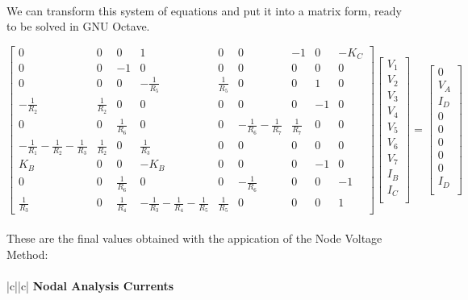 \paragraph{}
We can transform this system of equations and put it into a matrix form, ready to be solved in GNU Octave.

\[
\begin{bmatrix}
0 & 0 & 0 & 1 & 0 & 0 & -1 & 0 & -K_C\\
0 & 0 & -1 & 0 & 0 & 0 & 0 & 0 & 0\\ 
0 & 0 & 0 & -\frac{1}{R_5} & \frac{1}{R_5} & 0 & 0 & 1 & 0\\
-\frac{1}{R_2} & \frac{1}{R_2} & 0 & 0 & 0 & 0 & 0 & -1 & 0\\
0 & 0 & \frac{1}{R_6} & 0 & 0 & -\frac{1}{R_6}-\frac{1}{R_7}&\frac{1}{R_7} & 0 & 0\\ 
-\frac{1}{R_1}-\frac{1}{R_2}-\frac{1}{R_3} & \frac{1}{R_2} & 0 & \frac{1}{R_3} & 0 & 0 & 0 & 0 & 0\\ 
K_B & 0 & 0 & -K_B & 0 & 0 & 0 & -1 & 0\\ 
0 & 0 & \frac{1}{R_6} & 0 & 0 & -\frac{1}{R_6} & 0 & 0 & -1\\ 
\frac{1}{R_3} & 0 & \frac{1}{R_4} & -\frac{1}{R_3}-\frac{1}{R_4}-\frac{1}{R_5} & \frac{1}{R_5} & 0 & 0 & 0 & 1
\end{bmatrix}
\begin{bmatrix}
V_1\\
V_2\\
V_3\\
V_4\\
V_5\\
V_6\\
V_7\\
I_B\\
I_C\\
\end{bmatrix}
=
\begin{bmatrix}
0\\
V_A\\
I_D\\
0\\
0\\
0\\
0\\
0\\
I_D\\
\end{bmatrix}
\]

\paragraph{}
These are the final values obtained with the appication of the Node Voltage Method:

\paragraph{} \centering
  \begin{tabular}{|c||c|} 
    \hline    
      {\bf Nodal Analysis Currents } \\
    \hline

        
     
  \end{tabular}
